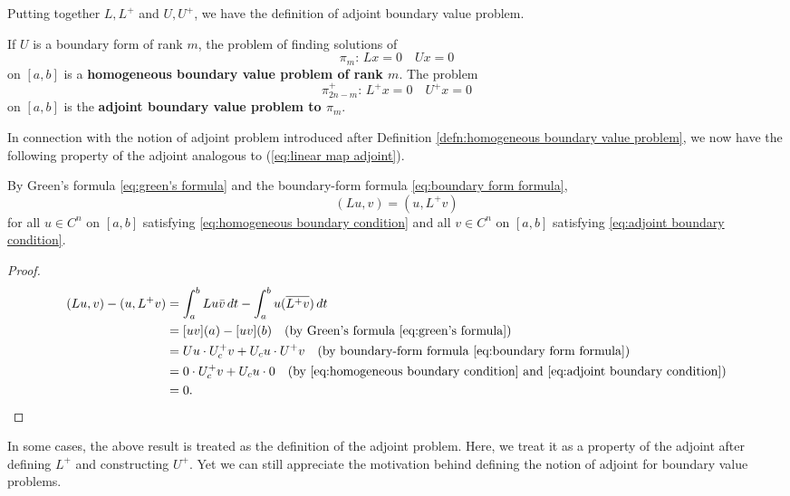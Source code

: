 \documentclass[11pt, oneside, a4paper]{article}
\begin{document}
Putting together $L, L^+$ and $U, U^+$, we have the definition of adjoint boundary value problem.

\begin{defn}\cite[p.291]{CoddingtonLevinson}\label{defn:adjoint boundary value problem}
    If $U$ is a boundary form of rank $m$, the problem of finding solutions of
    \[\pi_m:\,Lx=0\quad Ux=0\]
    on $[a,b]$ is a \textbf{homogeneous boundary value problem of rank $m$}. The problem
    \[\pi_{2n-m}^+:\,L^+x=0\quad U^+x=0\]
    on $[a,b]$ is the \textbf{adjoint boundary value problem to $\pi_m$}.
\end{defn}

In connection with the notion of adjoint problem introduced after Definition \ref{defn:homogeneous boundary value problem}, we now have the following property of the adjoint analogous to (\ref{eq:linear map adjoint}).

\begin{prop}\label{prop:(Lu,v)=(u,L^+v)}
    By Green's formula \eqref{eq:green's formula} and the boundary-form formula \eqref{eq:boundary form formula}, 
    \[(Lu, v) = (u, L^+v)\]
    for all $u\in C^n$ on $[a,b]$ satisfying \eqref{eq:homogeneous boundary condition} and all $v\in C^n$ on $[a,b]$ satisfying \eqref{eq:adjoint boundary condition}.
\end{prop}
\begin{proof}
    \begin{equation}
        \begin{split}
            (Lu, v) - (u, L^+v) &= \int_a^b Lu\bar{v}\,dt - \int_a^b u(\overline{L^+v})\,dt\\
            &= [uv](a) - [uv](b) \quad\mbox{(by Green's formula \eqref{eq:green's formula})}\\
            &= Uu\cdot U_c^+ v + U_c u\cdot U^+v \quad\mbox{(by boundary-form formula \eqref{eq:boundary form formula})}\\
            &= 0\cdot U_c^+ v + U_c u \cdot 0 \quad\mbox{(by \eqref{eq:homogeneous boundary condition} and \eqref{eq:adjoint boundary condition})}\\
            &= 0.\qedhere
        \end{split}
    \end{equation}
\end{proof}

In some cases, the above result is treated as the definition of the adjoint problem. Here, we treat it as a property of the adjoint after defining $L^+$ and constructing $U^+$. Yet we can still appreciate the motivation behind defining the notion of adjoint for boundary value problems.
\end{document}
